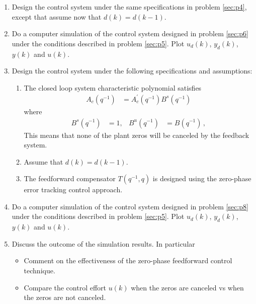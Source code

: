 \begin{enumerate}
    \item
    \label{sec:p6}
    Design the control system under the same specifications in problem \ref{sec:p4}, except that assume now that $d(k) = d(k-1)$.

    \item
    Do a computer simulation of the control system designed in problem \ref{sec:p6} under the  conditions
    described in problem \ref{sec:p5}. Plot $u_d(k)$, $y_d(k)$, $y(k)$ and $u(k)$.

    \item
    \label{sec:p8}
    Design the control system under the following specifications and assumptions:

    \begin{enumerate}
        \item
        The closed loop  system characteristic polynomial satisfies
        \begin{align*}
            A_c (q^{-1}) &= A_c^{' } (q^{-1})  B^s(q^{-1})
        \end{align*}
        where
        \begin{align*}
            B^s(q^{-1}) & = 1,
                & B^u(q^{-1}) & = B(q^{-1})\,,
        \end{align*}
        This means that none of the plant zeros will be canceled by the feedback system.

        \item
        Assume that
        $d(k) = d(k-1)$.

        \item
        The feedforward compensator  $T(q^{-1},q)$ is designed using the zero-phase error tracking control approach.
    \end{enumerate}

    \item
    Do a computer simulation of the control system designed in problem \ref{sec:p8} under the  conditions
    described in problem \ref{sec:p5}. Plot $u_d(k)$, $y_d(k)$, $y(k)$ and $u(k)$.

    \item
    Discuss the outcome of the simulation results. In particular
    \begin{itemize}
        \item Comment on the effectiveness of the zero-phase feedforward control technique.
        \item Compare the control effort $u(k)$ when the zeros are canceled vs when the zeros are not canceled.
    \end{itemize}
\end{enumerate}
